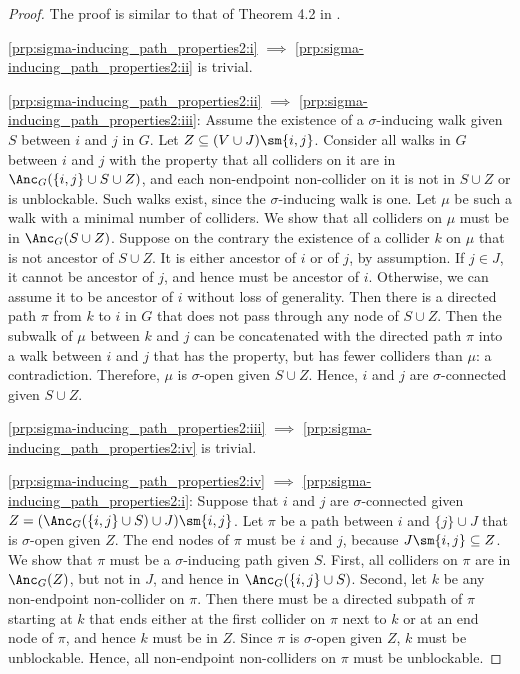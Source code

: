\begin{proof}
  The proof is similar to that of Theorem 4.2 in \cite{RichardsonSpirtes02}.

  \ref{prp:sigma-inducing_path_properties2:i} $\implies$ \ref{prp:sigma-inducing_path_properties2:ii} is trivial.

  \ref{prp:sigma-inducing_path_properties2:ii} $\implies$ \ref{prp:sigma-inducing_path_properties2:iii}: Assume the existence of a $\sigma$-inducing walk given $S$ between $i$ and $j$ in $G$. 
  Let $Z \subseteq (V \cup J) \sm\{i,j\}$. 
  Consider all walks in $G$ between $i$ and $j$ with the property that all colliders on it are in $\Anc_{G}({\{i,j\} \cup S \cup Z)}$, and each non-endpoint non-collider on it is not in $S \cup Z$ or is unblockable.
  Such walks exist, since the $\sigma$-inducing walk is one. 
  Let $\mu$ be such a walk with a minimal number of colliders.
  We show that all colliders on $\mu$ must be in $\Anc_{G}(S \cup Z)$. 
  Suppose on the contrary the existence of a collider $k$ on $\mu$ that is not ancestor of $S \cup Z$.
  It is either ancestor of $i$ or of $j$, by assumption.
  If $j \in J$, it cannot be ancestor of $j$, and hence must be ancestor of $i$.
  Otherwise, we can assume it to be ancestor of $i$ without loss of generality.
  Then there is a directed path $\pi$ from $k$ to $i$ in $G$ that does not pass through any node of $S \cup Z$.
  Then the subwalk of $\mu$ between $k$ and $j$ can be concatenated with the directed path $\pi$
  into a walk between $i$ and $j$ that has the property, but has fewer colliders than $\mu$: a contradiction. 
  Therefore, $\mu$ is $\sigma$-open given $S \cup Z$.
  Hence, $i$ and $j$ are $\sigma$-connected given $S \cup Z$.

  \ref{prp:sigma-inducing_path_properties2:iii} $\implies$ \ref{prp:sigma-inducing_path_properties2:iv} is trivial.

  \ref{prp:sigma-inducing_path_properties2:iv} $\implies$ \ref{prp:sigma-inducing_path_properties2:i}:
  Suppose that %
  $i$ and $j$ are $\sigma$-connected given $Z = (\Anc_{G}(\{i,j\} \cup S) \cup J) \sm \{i,j\}$. 
  Let $\pi$ be a path between $i$ and $\{j\} \cup J$ that is $\sigma$-open given $Z$. %
  The end nodes of $\pi$ must be $i$ and $j$, because $J \sm \{i,j\} \subseteq Z$.
  We show that $\pi$ must be a $\sigma$-inducing path given $S$. 
  First, all colliders on $\pi$ are in $\Anc_G(Z)$, but not in $J$, and hence in $\Anc_{G}(\{i,j\} \cup S)$.
  Second, let $k$ be any non-endpoint non-collider on $\pi$.
  Then there must be a directed subpath of $\pi$ starting at $k$ that ends either at the first collider on $\pi$ next to $k$ or at an end node of $\pi$, and hence $k$ must be in $Z$. 
  Since $\pi$ is $\sigma$-open given $Z$, $k$ must be unblockable.
  Hence, all non-endpoint non-colliders on $\pi$ must be unblockable.
\end{proof}

